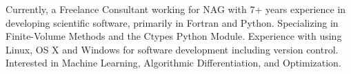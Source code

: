 

\begin{cvparagraph}

Currently, a Freelance Consultant working for NAG with 7+ years experience in developing scientific sof\/tware, primarily in Fortran and Python. Specializing in Finite-Volume Methods and the Ctypes Python Module. Experience with using Linux, OS X and Windows for sof\/tware development including version control. Interested in Machine Learning, Algorithmic Dif\/ferentiation, and Optimization.
\end{cvparagraph}
